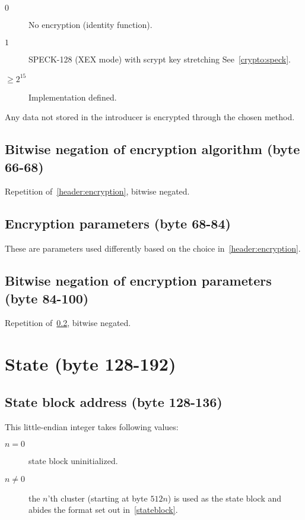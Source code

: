 \documentclass[11pt,a4paper]{report}
\newcommand{\clustersize}{512 }
\begin{document}
        \begin{description}
            \item [$0$] No encryption (identity function).
            \item [$1$] SPECK-128 (XEX mode) with scrypt key stretching
                See~\ref{crypto:speck}.
            \item [$\geq 2^{15}$] Implementation defined.
        \end{description}

        Any data not stored in the introducer is encrypted through the chosen method.

        \subsection{Bitwise negation of encryption algorithm (byte 66-68)}
        Repetition of~\ref{header:encryption}, bitwise negated.

        \subsection{Encryption parameters (byte 68-84)}
        \label{header:encryptionparams}
        These are parameters used differently based on the choice
        in~\ref{header:encryption}.

        \subsection{Bitwise negation of encryption parameters (byte 84-100)}
        Repetition of~\ref{header:encryptionparams}, bitwise negated.

        \section{State (byte 128-192)}
        \subsection{State block address (byte 128-136)}
        \label{header:stateblock}
        This little-endian integer takes following values:

        \begin{description}
            \item [$n = 0$]    state block uninitialized.
            \item [$n \neq 0$] the $n$'th cluster
                (starting at byte $\clustersize n$) is used
                as the state block and abides the format set out
                in~\ref{stateblock}.
        \end{description}
\end{document}
